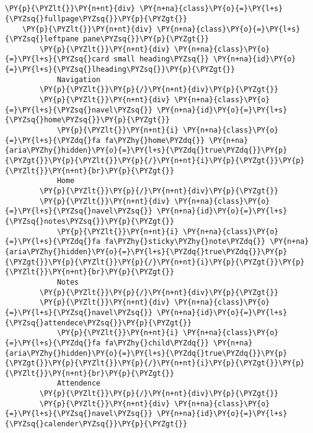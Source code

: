 \section*{}

\begin{Verbatim}[commandchars=\\\{\}]
\PY{p}{\PYZlt{}}\PY{n+nt}{div} \PY{n+na}{class}\PY{o}{=}\PY{l+s}{\PYZsq{}fullpage\PYZsq{}}\PY{p}{\PYZgt{}}
    \PY{p}{\PYZlt{}}\PY{n+nt}{div} \PY{n+na}{class}\PY{o}{=}\PY{l+s}{\PYZsq{}leftpane pane\PYZsq{}}\PY{p}{\PYZgt{}}
        \PY{p}{\PYZlt{}}\PY{n+nt}{div} \PY{n+na}{class}\PY{o}{=}\PY{l+s}{\PYZsq{}card small heading\PYZsq{}} \PY{n+na}{id}\PY{o}{=}\PY{l+s}{\PYZsq{}lheading\PYZsq{}}\PY{p}{\PYZgt{}}
            Navigation
        \PY{p}{\PYZlt{}}\PY{p}{/}\PY{n+nt}{div}\PY{p}{\PYZgt{}}
        \PY{p}{\PYZlt{}}\PY{n+nt}{div} \PY{n+na}{class}\PY{o}{=}\PY{l+s}{\PYZsq{}navel\PYZsq{}} \PY{n+na}{id}\PY{o}{=}\PY{l+s}{\PYZsq{}home\PYZsq{}}\PY{p}{\PYZgt{}}
            \PY{p}{\PYZlt{}}\PY{n+nt}{i} \PY{n+na}{class}\PY{o}{=}\PY{l+s}{\PYZdq{}fa fa\PYZhy{}home\PYZdq{}} \PY{n+na}{aria\PYZhy{}hidden}\PY{o}{=}\PY{l+s}{\PYZdq{}true\PYZdq{}}\PY{p}{\PYZgt{}}\PY{p}{\PYZlt{}}\PY{p}{/}\PY{n+nt}{i}\PY{p}{\PYZgt{}}\PY{p}{\PYZlt{}}\PY{n+nt}{br}\PY{p}{\PYZgt{}}
            Home
        \PY{p}{\PYZlt{}}\PY{p}{/}\PY{n+nt}{div}\PY{p}{\PYZgt{}}
        \PY{p}{\PYZlt{}}\PY{n+nt}{div} \PY{n+na}{class}\PY{o}{=}\PY{l+s}{\PYZsq{}navel\PYZsq{}} \PY{n+na}{id}\PY{o}{=}\PY{l+s}{\PYZsq{}notes\PYZsq{}}\PY{p}{\PYZgt{}}
            \PY{p}{\PYZlt{}}\PY{n+nt}{i} \PY{n+na}{class}\PY{o}{=}\PY{l+s}{\PYZdq{}fa fa\PYZhy{}sticky\PYZhy{}note\PYZdq{}} \PY{n+na}{aria\PYZhy{}hidden}\PY{o}{=}\PY{l+s}{\PYZdq{}true\PYZdq{}}\PY{p}{\PYZgt{}}\PY{p}{\PYZlt{}}\PY{p}{/}\PY{n+nt}{i}\PY{p}{\PYZgt{}}\PY{p}{\PYZlt{}}\PY{n+nt}{br}\PY{p}{\PYZgt{}}
            Notes
        \PY{p}{\PYZlt{}}\PY{p}{/}\PY{n+nt}{div}\PY{p}{\PYZgt{}}
        \PY{p}{\PYZlt{}}\PY{n+nt}{div} \PY{n+na}{class}\PY{o}{=}\PY{l+s}{\PYZsq{}navel\PYZsq{}} \PY{n+na}{id}\PY{o}{=}\PY{l+s}{\PYZsq{}attendece\PYZsq{}}\PY{p}{\PYZgt{}}
            \PY{p}{\PYZlt{}}\PY{n+nt}{i} \PY{n+na}{class}\PY{o}{=}\PY{l+s}{\PYZdq{}fa fa\PYZhy{}child\PYZdq{}} \PY{n+na}{aria\PYZhy{}hidden}\PY{o}{=}\PY{l+s}{\PYZdq{}true\PYZdq{}}\PY{p}{\PYZgt{}}\PY{p}{\PYZlt{}}\PY{p}{/}\PY{n+nt}{i}\PY{p}{\PYZgt{}}\PY{p}{\PYZlt{}}\PY{n+nt}{br}\PY{p}{\PYZgt{}}
            Attendence
        \PY{p}{\PYZlt{}}\PY{p}{/}\PY{n+nt}{div}\PY{p}{\PYZgt{}}
        \PY{p}{\PYZlt{}}\PY{n+nt}{div} \PY{n+na}{class}\PY{o}{=}\PY{l+s}{\PYZsq{}navel\PYZsq{}} \PY{n+na}{id}\PY{o}{=}\PY{l+s}{\PYZsq{}calender\PYZsq{}}\PY{p}{\PYZgt{}}

\end{Verbatim}
